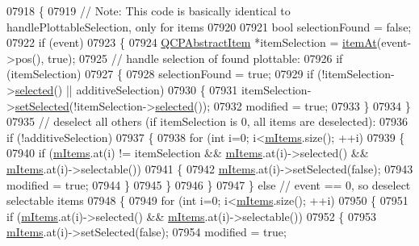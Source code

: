 \begin{DoxyCode}
07918 \{
07919   \textcolor{comment}{// Note: This code is basically identical to handlePlottableSelection, only for items}
07920   
07921   \textcolor{keywordtype}{bool} selectionFound = \textcolor{keyword}{false};
07922   \textcolor{keywordflow}{if} (event)
07923   \{
07924     \hyperlink{a00022}{QCPAbstractItem} *itemSelection = \hyperlink{a00116_a793e4b04e0ede11a733021907368fa83}{itemAt}(event->pos(), \textcolor{keyword}{true});
07925     \textcolor{comment}{// handle selection of found plottable:}
07926     \textcolor{keywordflow}{if} (itemSelection)
07927     \{
07928       selectionFound = \textcolor{keyword}{true};
07929       \textcolor{keywordflow}{if} (!itemSelection->\hyperlink{a00022_a225865808640d8d9a7dd19f09a2e93f2}{selected}() || additiveSelection)
07930       \{
07931         itemSelection->\hyperlink{a00022_a203de94ad586cc44d16c9565f49d3378}{setSelected}(!itemSelection->\hyperlink{a00022_a225865808640d8d9a7dd19f09a2e93f2}{selected}());
07932         modified = \textcolor{keyword}{true};
07933       \}
07934     \}
07935     \textcolor{comment}{// deselect all others (if itemSelection is 0, all items are deselected):}
07936     \textcolor{keywordflow}{if} (!additiveSelection)
07937     \{
07938       \textcolor{keywordflow}{for} (\textcolor{keywordtype}{int} i=0; i<\hyperlink{a00116_a6fcfff6ea3ccabcac8818943adb79a72}{mItems}.size(); ++i)
07939       \{
07940         \textcolor{keywordflow}{if} (\hyperlink{a00116_a6fcfff6ea3ccabcac8818943adb79a72}{mItems}.at(i) != itemSelection && \hyperlink{a00116_a6fcfff6ea3ccabcac8818943adb79a72}{mItems}.at(i)->selected() && 
      \hyperlink{a00116_a6fcfff6ea3ccabcac8818943adb79a72}{mItems}.at(i)->selectable())
07941         \{
07942           \hyperlink{a00116_a6fcfff6ea3ccabcac8818943adb79a72}{mItems}.at(i)->setSelected(\textcolor{keyword}{false});
07943           modified = \textcolor{keyword}{true};
07944         \}
07945       \}
07946     \}
07947   \} \textcolor{keywordflow}{else} \textcolor{comment}{// event == 0, so deselect selectable items}
07948   \{
07949     \textcolor{keywordflow}{for} (\textcolor{keywordtype}{int} i=0; i<\hyperlink{a00116_a6fcfff6ea3ccabcac8818943adb79a72}{mItems}.size(); ++i)
07950     \{
07951       \textcolor{keywordflow}{if} (\hyperlink{a00116_a6fcfff6ea3ccabcac8818943adb79a72}{mItems}.at(i)->selected() && \hyperlink{a00116_a6fcfff6ea3ccabcac8818943adb79a72}{mItems}.at(i)->selectable())
07952       \{
07953         \hyperlink{a00116_a6fcfff6ea3ccabcac8818943adb79a72}{mItems}.at(i)->setSelected(\textcolor{keyword}{false});
07954         modified = \textcolor{keyword}{true};

\end{DoxyCode}
